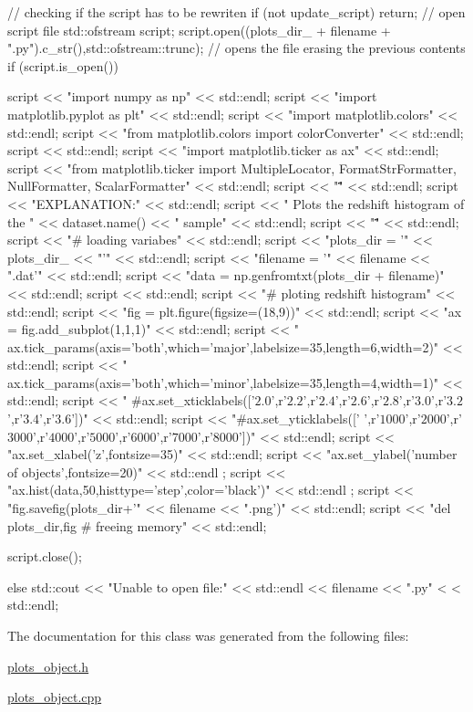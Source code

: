 \begin{DoxyCode}
{    // checking if the script has to be rewriten
    if (not update_script){
        return;
    }
    // open script file
    std::ofstream script;
    script.open((plots_dir_ + filename + ".py").c_str(),std::ofstream::trunc); 
      // opens the file erasing the previous contents
    if (script.is_open()){
        script << "import numpy as np" << std::endl;
        script << "import matplotlib.pyplot as plt" << std::endl;
        script << "import matplotlib.colors" << std::endl;
        script << "from matplotlib.colors import colorConverter" << std::endl;
        script << std::endl;
        script << "import matplotlib.ticker as ax" << std::endl;
        script << "from matplotlib.ticker import MultipleLocator,
       FormatStrFormatter, NullFormatter, ScalarFormatter" << std::endl;
        script << "\"\"\"" << std::endl;
        script << "EXPLANATION:" << std::endl;
        script << "    Plots the redshift histogram of the " << dataset.name() 
      << " sample" << std::endl;
        script << "\"\"\"" << std::endl;
        script << "# loading variabes" << std::endl;
        script << "plots_dir = '" << plots_dir_ << "'" << std::endl;
        script << "filename = '" << filename << ".dat'" << std::endl;
        script << "data = np.genfromtxt(plots_dir + filename)" << std::endl;
        script << std::endl;
        script << "# ploting redshift histogram" << std::endl;
        script << "fig = plt.figure(figsize=(18,9))" << std::endl;
        script << "ax = fig.add_subplot(1,1,1)" << std::endl;
        script << "
      ax.tick_params(axis='both',which='major',labelsize=35,length=6,width=2)" << std::endl;
        script << "
      ax.tick_params(axis='both',which='minor',labelsize=35,length=4,width=1)" << std::endl;
        script << "
      #ax.set_xticklabels(['$2.0$',r'$2.2$',r'$2.4$',r'$2.6$',r'$2.8$',r'$3.0$',r'$3.2$',r'$3.4$',r'$3.6$'])" << std::endl;
        script << "#ax.set_yticklabels(['
       ',r'$1000$',r'$2000$',r'$3000$',r'$4000$',r'$5000$',r'$6000$',r'$7000$',r'$8000$'])" << std::endl;
        script << "ax.set_xlabel('z',fontsize=35)" << std::endl;
        script << "ax.set_ylabel('number of objects',fontsize=20)" << std::endl
      ;
        script << "ax.hist(data,50,histtype='step',color='black')" << std::endl
      ;
        script << "fig.savefig(plots_dir+'" << filename << ".png')" << 
      std::endl;
        script << "del plots_dir,fig # freeing memory" << std::endl;
        
        script.close();
    }
    else{
        std::cout << "Unable to open file:" << std::endl << filename << ".py" <
      < std::endl;
    }
}
\end{DoxyCode}


The documentation for this class was generated from the following files\-:\begin{DoxyCompactItemize}
\item 
\hyperlink{plots__object_8h}{plots\-\_\-object.\-h}\item 
\hyperlink{plots__object_8cpp}{plots\-\_\-object.\-cpp}\end{DoxyCompactItemize}
